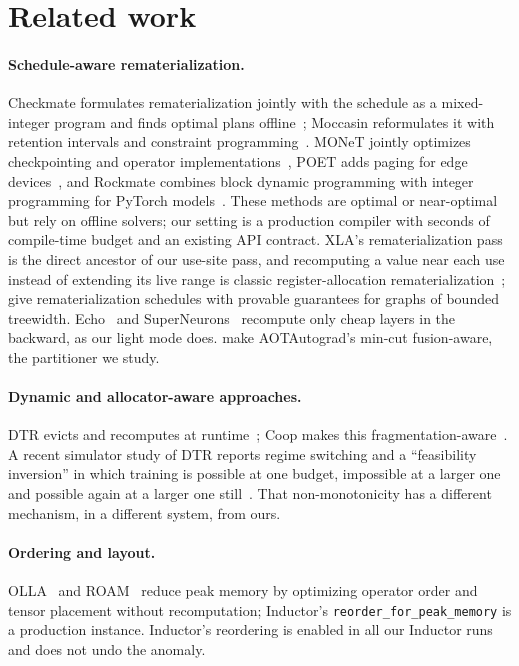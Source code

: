 \documentclass[10pt]{article}
\newcommand{\code}[1]{\texttt{#1}}
\begin{document}
\section{Related work}
\label{sec:related}
\paragraph{Schedule-aware rematerialization.}
Checkmate formulates rematerialization jointly with the schedule as a mixed-integer program and finds optimal plans
offline~\citep{jain2020checkmate}; Moccasin reformulates it with retention intervals and constraint
programming~\citep{bartan2023moccasin}. MONeT jointly optimizes checkpointing and operator
implementations~\citep{shah2021monet}, POET adds paging for edge devices~\citep{patil2022poet}, and Rockmate combines
block dynamic programming with integer programming for PyTorch models~\citep{zhao2023rockmate}. These methods are optimal
or near-optimal but rely on offline solvers; our setting is a production compiler with seconds of compile-time budget and
an existing API contract. XLA's rematerialization pass~\citep{xlaremat} is the direct ancestor of our use-site pass, and recomputing a value near
each use instead of extending its live range is classic register-allocation rematerialization~\citep{briggs1992remat};
\citet{kumar2019efficient} give rematerialization schedules with provable guarantees for graphs of bounded treewidth.
Echo~\citep{zheng2020echo} and SuperNeurons~\citep{wang2018superneurons} recompute only cheap layers in the backward,
as our light mode does. \citet{he2023fusionaware} make AOTAutograd's min-cut fusion-aware, the partitioner we study.
\paragraph{Dynamic and allocator-aware approaches.}
DTR evicts and recomputes at runtime~\citep{kirisame2021dtr}; Coop makes this fragmentation-aware~\citep{zhang2023coop}.
A recent simulator study of DTR reports regime switching and a ``feasibility inversion'' in which training is possible at one
budget, impossible at a larger one and possible again at a larger one still~\citep{pagadala2026regime}. That
non-monotonicity has a different mechanism, in a different system, from ours.
\paragraph{Ordering and layout.} OLLA~\citep{steiner2022olla} and ROAM~\citep{shu2023roam} reduce peak memory by
optimizing operator order and tensor placement without recomputation; Inductor's \code{reorder\_for\_peak\_memory} is a
production instance. Inductor's reordering is enabled in all our Inductor runs and does not undo the anomaly.
\end{document}
